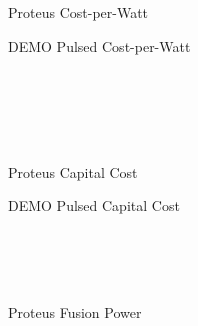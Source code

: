 \begin{figure*}
    \centering
    \hfill
    \begin{subfigure}[t]{0.45\textwidth}
        \centering
		\begin{adjustbox}{width=\textwidth}
			\Large
			
		\end{adjustbox}
        \caption{Proteus Cost-per-Watt}
    \end{subfigure}
    \hfill
    \begin{subfigure}[t]{0.45\textwidth}
        \centering
		\begin{adjustbox}{width=\textwidth}
			\Large
			
		\end{adjustbox}
        \caption{DEMO Pulsed Cost-per-Watt}
    \end{subfigure}
    \hfill \hfill ~\\ ~\\ ~\\ ~\\
    \hfill
    \begin{subfigure}[t]{0.45\textwidth}
        \centering
		\begin{adjustbox}{width=\textwidth}
			\Large
			
		\end{adjustbox}
        \caption{Proteus Capital Cost}
    \end{subfigure}
    \hfill
    \begin{subfigure}[t]{0.45\textwidth}
        \centering
		\begin{adjustbox}{width=\textwidth}
			\Large
			
		\end{adjustbox}
        \caption{DEMO Pulsed Capital Cost}
    \end{subfigure}
    \hfill \hfill ~\\ ~\\ ~\\
    \hfill
    \begin{subfigure}[t]{0.45\textwidth}
        \centering
		\begin{adjustbox}{width=\textwidth}
			\Large
			
		\end{adjustbox}
        \caption{Proteus Fusion Power}
    \end{subfigure}
    \hfill
    \begin{subfigure}[t]{0.45\textwidth}
        \centering
		\begin{adjustbox}{width=\textwidth}

\end{adjustbox}
\end{subfigure}
\end{figure*}
